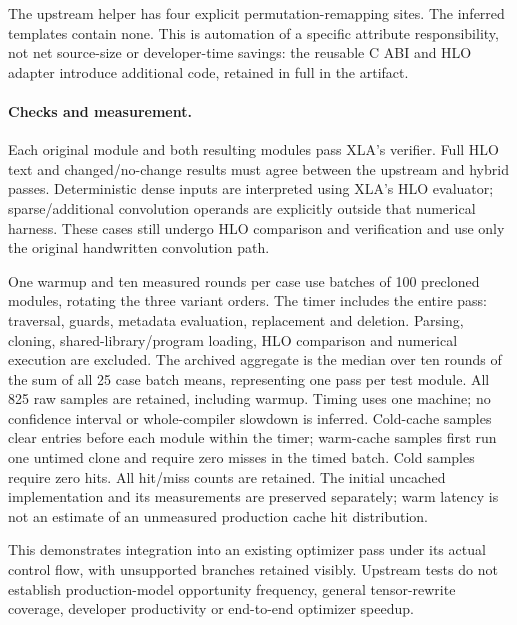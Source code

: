 The upstream helper has four explicit permutation-remapping sites. The
inferred templates contain none. This is automation of a specific attribute
responsibility, not net source-size or developer-time savings: the reusable C ABI
and HLO adapter introduce additional code, retained in full in the artifact.

\paragraph{Checks and measurement.}
Each original module and both resulting modules pass XLA's verifier. Full HLO
text and changed/no-change results must agree between the upstream and hybrid
passes. Deterministic dense inputs are interpreted using XLA's HLO evaluator;
sparse/additional convolution operands are explicitly outside that numerical
harness. These cases still undergo HLO comparison and verification and use
only the original handwritten convolution path.

One warmup and ten measured rounds per case use batches of 100 precloned
modules, rotating the three variant orders. The timer includes the entire pass:
traversal, guards, metadata evaluation, replacement and deletion. Parsing,
cloning, shared-library/program loading, HLO comparison and numerical execution
are excluded. The archived aggregate is the median over ten rounds of
the sum of all 25 case batch means, representing one pass per test module.
All 825 raw samples are retained, including warmup. Timing uses one machine;
no confidence interval or whole-compiler slowdown is inferred.
Cold-cache samples clear entries before each module within the timer; warm-cache
samples first run one untimed clone and require zero misses in the timed batch.
Cold samples require zero hits. All hit/miss counts are retained. The initial
uncached implementation and its measurements are preserved separately; warm
latency is not an estimate of an unmeasured production cache hit distribution.

This demonstrates integration into an existing optimizer pass under its actual
control flow, with unsupported branches retained visibly. Upstream tests do
not establish production-model opportunity frequency, general tensor-rewrite
coverage, developer productivity or end-to-end optimizer speedup.
